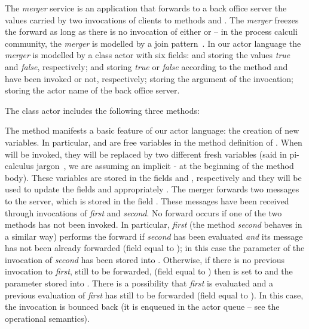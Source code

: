 \documentclass{LMCS}
\theoremstyle{plain}\newtheorem{proposition}[thm]{Proposition}
\theoremstyle{plain}\newtheorem{lemma}[thm]{Lemma}
\theoremstyle{plain}\newtheorem{theorem}[thm]{Theorem}
\theoremstyle{plain}\newtheorem{corollary}[thm]{Corollary}
\begin{document}
\begin{exa}
The \emph{merger} service is an application that forwards 
to a back office server the values carried by two invocations of 
clients to methods  and . The \emph{merger}
freezes the forward as long as there is no invocation of either  
 or  -- in the process calculi community,
the \emph{merger} is modelled by a join pattern~\cite{FG96}.
In our actor language the \emph{merger} is modelled by a class actor
 with six fields:  and  storing the  values \emph{true} and \emph{false}, respectively;  and 
storing \emph{true} or \emph{false} according to the method 
 and  have been invoked or not, respectively;
 storing the  argument of the invocation;  storing the
actor name of the back office server.

The class actor  
includes the following three methods:
{\small

}The method  manifests a basic feature of our actor language: 
the creation of new variables. In particular,  and  are free
variables in the method definition of . When  will be invoked, they 
will be replaced by two different fresh variables
(said in pi-calculus jargon~\cite{PIC}, we are 
assuming an implicit - at the beginning of the method body). These 
variables are stored in the fields  and , respectively and they 
will be used to 
update the fields  and  appropriately
.
The merger forwards two messages to the server, which is stored in the field 
. These messages have been received through invocations of {\it first} and {\it second}.
No forward occurs if one of the two methods has not been invoked. In particular,
{\it first} (the method {\it second} behaves in a similar way) performs the
forward if {\it second} has been evaluated \emph{and} its message has not
been already forwarded  (field  equal to ); in this case
the parameter of the invocation of {\it second} has been stored into . Otherwise, if there is no
previous invocation to {\it first}, still to be forwarded, (field  equal 
to ) then  is set to  and the parameter stored into .
There is a possibility that {\it first} is evaluated and a previous evaluation 
of {\it first} has still to be forwarded (field  equal 
to ). In this case,  the invocation is bounced back (it is enqueued in the 
actor queue -- see the operational semantics). 
  



\end{exa}
\fi
\end{document}
